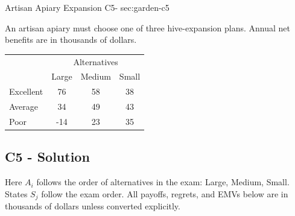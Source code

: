 \sectionScored
	{Artisan Apiary Expansion}
	{C5-}
	{sec:garden-c5}
	{
	\label{sec:c5-exam-solutions}
	An artisan apiary must choose one of three hive-expansion plans. Annual net benefits are in thousands of dollars.
		\begin{center}
			\setlength{\tabcolsep}{3pt}
			\renewcommand{\arraystretch}{1.1}
			\begin{tabular}{lccc}
				\toprule
				& \multicolumn{3}{c}{Alternatives} \\
				& Large & Medium & Small \\ \midrule
				Excellent & 76 & 58 & 38 \\
				Average   & 34 & 49 & 43 \\
				Poor      & -14 & 23 & 35 \\ \bottomrule
			\end{tabular}
		\end{center}


	\label{subsec:garden-c5-solution}
	\subsection*{C5 - Solution }

	Here $A_i$ follows the order of alternatives in the exam: Large, Medium, Small. States $S_j$ follow the exam order. All payoffs, regrets, and EMVs below are in thousands of dollars unless converted explicitly.

}
